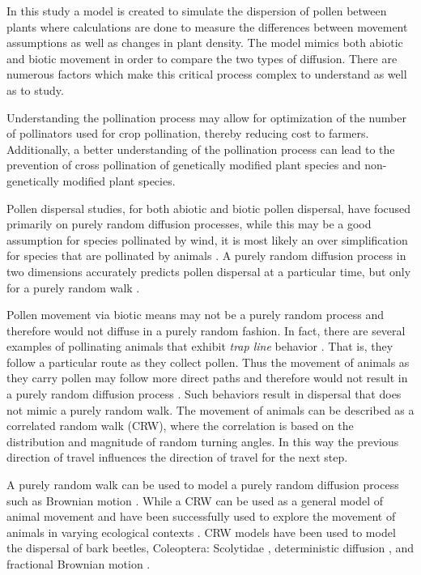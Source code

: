 \documentclass{tran-l}
\theoremstyle{definition}
\theoremstyle{remark}
\numberwithin{equation}{subsection}
\begin{document}
In this study a model is created to simulate the dispersion of pollen between plants where calculations are done to measure the differences between movement assumptions as well as changes in plant density.  The model mimics both abiotic and biotic movement in order to compare the two types of diffusion.  There are numerous factors which make this critical process complex to understand as well as to study.

 Understanding the
pollination process may allow for optimization of the number of pollinators used
for crop pollination, thereby reducing cost to farmers. Additionally, a better
understanding of the pollination process can lead to the prevention of cross
pollination of genetically modified plant species and non-genetically modified
plant species.

Pollen dispersal studies, for both abiotic and biotic pollen dispersal, have
focused primarily on purely random diffusion processes, while this may be a good
assumption for species pollinated by wind, it is most likely an over
simplification for species that are pollinated by animals \cite{Chan}. A purely
random diffusion process in two dimensions accurately predicts pollen dispersal
at a particular time, but only for a purely random walk \cite{Byers01}.

Pollen movement via biotic means may not be a purely random process and
therefore would not diffuse in a purely random fashion. In fact, there are
several examples of pollinating animals that exhibit \emph{trap line} behavior
\cite{Chan}. That is, they follow a particular route as they collect pollen.
Thus the movement of animals as they carry pollen may follow more direct paths
and therefore would not result in a purely random diffusion process
\cite{Cresswell03}. Such behaviors result in dispersal that does not mimic a
purely random walk. The movement of animals can be described as a correlated
random walk (CRW), where the correlation is based on the distribution and
magnitude of random turning angles. In this way the previous direction of travel
influences the direction of travel for the next step.

A purely random walk can be used to model a purely random diffusion process such
as Brownian motion \cite{Codling}. While a CRW can be used as a general model of
animal movement \cite{Prasad05} and have been successfully used to explore the
movement of animals in varying ecological contexts \cite{Bartumeus07}. CRW
models have been used to model the dispersal of bark beetles, Coleoptera:
Scolytidae \cite{Byers01}, deterministic diffusion \cite{Klages}, and fractional
Brownian motion \cite{Enriquez}.
\end{document}

